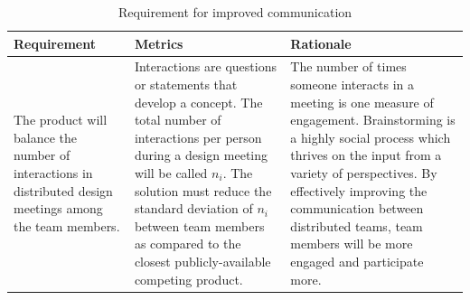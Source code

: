 \begin{table}[!h]
        \centering
                \begin{tabular}{| p{42mm} | p{42mm} | p{51mm} |}
                \hline
                \textbf{Requirement}    & \textbf{Metrics} & \textbf{Rationale}\\
                \hline
The product will balance the number of interactions in distributed design meetings among the team members. &    Interactions are questions or statements that develop a concept. The total number of interactions per person during a design meeting will be called $n_{i}$. The solution must reduce the standard deviation of $n_{i}$ between team members as compared to the closest publicly-available competing product.   & The number of times someone interacts in a meeting is one measure of engagement. Brainstorming is a highly social process which thrives on the input from a variety of perspectives. By effectively improving the communication between distributed teams, team members will be more engaged and participate more.\\
\hline
                \end{tabular}
        \caption{Requirement for improved communication}
        \label{tab:mediums1}
\end{table}

